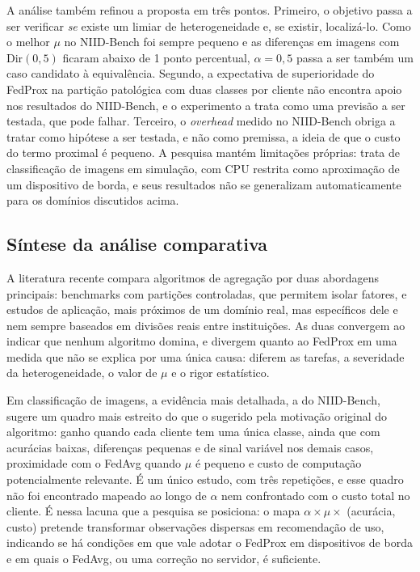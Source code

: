 A análise também refinou a proposta em três pontos. Primeiro, o objetivo passa a ser verificar \emph{se} existe um limiar de heterogeneidade e, se existir, localizá-lo. Como o melhor $\mu$ no NIID-Bench foi sempre pequeno e as diferenças em imagens com $\mathrm{Dir}(0{,}5)$ ficaram abaixo de 1 ponto percentual, $\alpha = 0{,}5$ passa a ser também um caso candidato à equivalência. Segundo, a expectativa de superioridade do FedProx na partição patológica com duas classes por cliente não encontra apoio nos resultados do NIID-Bench, e o experimento a trata como uma previsão a ser testada, que pode falhar. Terceiro, o \textit{overhead} medido no NIID-Bench obriga a tratar como hipótese a ser testada, e não como premissa, a ideia de que o custo do termo proximal é pequeno. A pesquisa mantém limitações próprias: trata de classificação de imagens em simulação, com CPU restrita como aproximação de um dispositivo de borda, e seus resultados não se generalizam automaticamente para os domínios discutidos acima.

\subsection{Síntese da análise comparativa}

A literatura recente compara algoritmos de agregação por duas abordagens principais: benchmarks com partições controladas, que permitem isolar fatores, e estudos de aplicação, mais próximos de um domínio real, mas específicos dele e nem sempre baseados em divisões reais entre instituições. As duas convergem ao indicar que nenhum algoritmo domina, e divergem quanto ao FedProx em uma medida que não se explica por uma única causa: diferem as tarefas, a severidade da heterogeneidade, o valor de $\mu$ e o rigor estatístico.

Em classificação de imagens, a evidência mais detalhada, a do NIID-Bench, sugere um quadro mais estreito do que o sugerido pela motivação original do algoritmo: ganho quando cada cliente tem uma única classe, ainda que com acurácias baixas, diferenças pequenas e de sinal variável nos demais casos, proximidade com o FedAvg quando $\mu$ é pequeno e custo de computação potencialmente relevante. É um único estudo, com três repetições, e esse quadro não foi encontrado mapeado ao longo de $\alpha$ nem confrontado com o custo total no cliente. É nessa lacuna que a pesquisa se posiciona: o mapa $\alpha \times \mu \times$ (acurácia, custo) pretende transformar observações dispersas em recomendação de uso, indicando se há condições em que vale adotar o FedProx em dispositivos de borda e em quais o FedAvg, ou uma correção no servidor, é suficiente.
